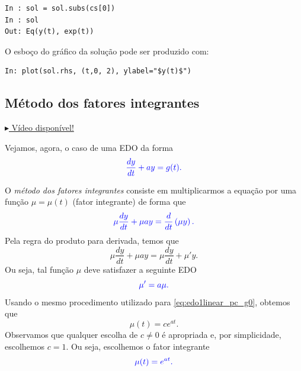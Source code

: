 \begin{ex}
\begin{verbatim}
In : sol = sol.subs(cs[0])
In : sol
Out: Eq(y(t), exp(t))
\end{verbatim}
O esboço do gráfico da solução pode ser produzido com:
\begin{verbatim}
In: plot(sol.rhs, (t,0, 2), ylabel="$y(t)$")
\end{verbatim}
  \fi
\end{ex}

\subsection{Método dos fatores integrantes}

\begin{flushright}
  \href{https://archive.org/details/edo-ordem-1-linear-coeficientes-constantes-nao-homogenea}{$\blacktriangleright$ Vídeo disponível!}
\end{flushright}

Vejamos, agora, o caso de uma EDO da forma
\begin{equation}\label{eq:edo1linear_pa_g}
  \color{blue}{\frac{dy}{dt} + ay = g(t).}
\end{equation}

O \emph{método dos fatores integrantes} consiste em multiplicarmos a equação por uma função $\mu = \mu(t)$ (fator integrante) de forma que
\begin{equation}
  \color{blue}{\mu\frac{dy}{dt} + \mu ay = \frac{d}{dt}\left(\mu y\right).}
\end{equation}
Pela regra do produto para derivada, temos que
\begin{equation}
  \mu\frac{dy}{dt} + \mu ay = \mu\frac{dy}{dt} + \mu'y.
\end{equation}
Ou seja, tal função $\mu$ deve satisfazer a seguinte EDO
\begin{equation}
  \color{blue}{\mu' = a\mu.}
\end{equation}
Usando o mesmo procedimento utilizado para \eqref{eq:edo1linear_pc_g0}, obtemos que
\begin{equation}
  \mu(t) = ce^{at}.
\end{equation}
Observamos que qualquer escolha de $c\neq 0$ é apropriada e, por simplicidade, escolhemos $c=1$. Ou seja, escolhemos o fator integrante
\begin{equation}
  \color{blue}{\mu(t) = e^{at}}.
\end{equation}

